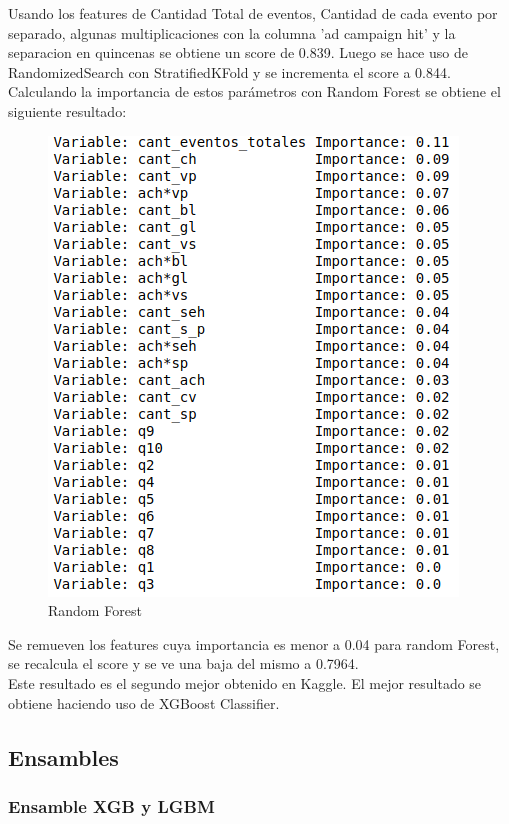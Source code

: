\documentclass[a4paper]{article}
\begin{document}
        Usando los features de Cantidad Total de eventos, Cantidad de cada evento por separado, algunas multiplicaciones con la columna 'ad campaign hit' y la separacion en quincenas se obtiene un score de 0.839. Luego se hace uso de RandomizedSearch con StratifiedKFold y se incrementa el score a 0.844. \\
        Calculando la importancia de estos parámetros con Random Forest se obtiene el siguiente resultado:\\
        \begin{figure}
              \centering
                \includegraphics{Screenshot from 2018-11-29 23-14-50.png}
              \caption{Random Forest}
              \label{fig:ejemplo}
            \end{figure}
        Se remueven los features cuya importancia es menor a 0.04 para random Forest, se recalcula el score y se ve una baja del mismo a 0.7964.\\
        Este resultado es el segundo mejor obtenido en Kaggle. El mejor resultado se obtiene haciendo uso de XGBoost Classifier.
    
   
    \subsection{Ensambles}\label{subset:ensambles}
            
        \subsubsection{Ensamble XGB y LGBM}\label{subsubset:ensamble xgb lgbm}
            
\end{document}

